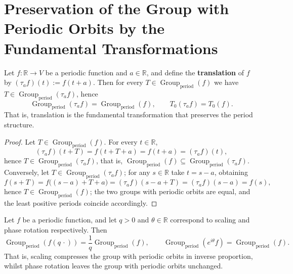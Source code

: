\section{Preservation of the Group with Periodic Orbits by the Fundamental Transformations}

\begin{proposition}\label{prop:period_translation}
Let $f:\mathbb{R}\to V$ be a periodic function and $a\in\mathbb{R}$, and define the \textbf{translation} of $f$ by $(\tau_a f)(t) := f(t+a)$. Then for every $T\in\operatorname{Group}_{\mathrm{period}}(f)$ we have $T\in\operatorname{Group}_{\mathrm{period}}(\tau_a f)$, hence
\[
\operatorname{Group}_{\mathrm{period}}(\tau_a f) = \operatorname{Group}_{\mathrm{period}}(f), \qquad T_0(\tau_a f) = T_0(f).
\]
That is, translation is the fundamental transformation that preserves the period structure.
\end{proposition}

\begin{proof}
Let $T\in\operatorname{Group}_{\mathrm{period}}(f)$. For every $t\in\mathbb{R}$,
\[
(\tau_a f)(t+T) = f(t+T+a) = f(t+a) = (\tau_a f)(t),
\]
hence $T\in\operatorname{Group}_{\mathrm{period}}(\tau_a f)$, that is, $\operatorname{Group}_{\mathrm{period}}(f)\subseteq\operatorname{Group}_{\mathrm{period}}(\tau_a f)$.
Conversely, let $T\in\operatorname{Group}_{\mathrm{period}}(\tau_a f)$; for any $s\in\mathbb{R}$ take $t = s-a$, obtaining
\[
f(s+T) = f\bigl((s-a)+T+a\bigr) = (\tau_a f)(s-a+T) = (\tau_a f)(s-a) = f(s),
\]
hence $T\in\operatorname{Group}_{\mathrm{period}}(f)$; the two groups with periodic orbits are equal, and the least positive periods coincide accordingly.
\end{proof}

\begin{proposition}\label{prop:scaling_rotation_period}
Let $f$ be a periodic function, and let $q>0$ and $\theta\in\mathbb{R}$ correspond to scaling and phase rotation respectively. Then
\[
\operatorname{Group}_{\mathrm{period}}(f(q\,\cdot)) = \frac{1}{q}\operatorname{Group}_{\mathrm{period}}(f), \qquad
\operatorname{Group}_{\mathrm{period}}(e^{i\theta} f) = \operatorname{Group}_{\mathrm{period}}(f).
\]
That is, scaling compresses the group with periodic orbits in inverse proportion, whilst phase rotation leaves the group with periodic orbits unchanged.
\end{proposition}


